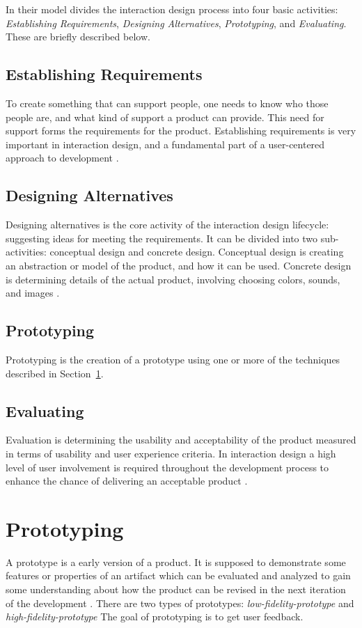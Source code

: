 \documentclass[../Main/thesis.tex]{subfiles}
\begin{document}
In their model \citet{Preece2011} divides the interaction design process into four basic activities: \textit{Establishing Requirements}, \textit{Designing Alternatives}, \textit{Prototyping}, and \textit{Evaluating}.
These are briefly described below.

\subsection{Establishing Requirements}
To create something that can support people, one needs to know who those people are, and what kind of support a product can provide. 
This need for support forms the requirements for the product.
Establishing requirements is very important in interaction design, and a fundamental part of a user-centered approach to development \citep{Preece2011}.

\subsection{Designing Alternatives}
Designing alternatives is the core activity of the interaction design lifecycle: suggesting ideas for meeting the requirements.
It can be divided into two sub-activities: conceptual design and concrete design.
Conceptual design is creating an abstraction or model of the product, and how it can be used.
Concrete design is determining details of the actual product, involving choosing colors, sounds, and images \citep{Preece2011}.

\subsection{Prototyping}
Prototyping is the creation of a prototype using one or more of the techniques described in Section~\ref{sec:prototyping}.

\subsection{Evaluating}
Evaluation is determining the usability and acceptability of the product measured in terms of usability and user experience criteria.
In interaction design a high level of user involvement is required throughout the development process to enhance the chance of delivering an acceptable product \citep{Preece2011}.

\section{Prototyping}
\label{sec:prototyping}
A prototype is a early version of a product. 
It is supposed to demonstrate some features or properties of an artifact which can be evaluated and analyzed to gain some understanding about how the product can be revised in the next iteration of the development \citep{oates2005researching}.
There are two types of prototypes: \textit{low-fidelity-prototype} and \textit{high-fidelity-prototype}
The goal of prototyping is to get user feedback.
\end{document}
